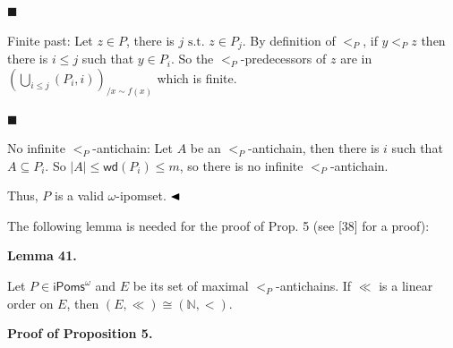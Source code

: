  
 
\par\noindent  $\blacksquare$ 
 
Finite past: Let $z\in P$, there is $j\text{ s.t.\ }z\in P_{j}$. By definition of $<_{P}$, if $y<_{P}z$ then there is $i\leqslant j$ such that $y\in P_{i}$. So the $<_{P}$-predecessors of $z$ are in $(\bigcup_{i\leqslant j}(P_{i},i))_{/x\sim f(x)}$ which is finite.\par
 
 
 
\par\noindent  $\blacksquare$ 
 
No infinite $<_{P}$-antichain: Let $A$ be an $<_{P}$-antichain, then there is $i$ such that $A\subseteq P_{i}$. So $|A|\leqslant\mathsf{wd}(P_{i})\leqslant m$, so there is no infinite $<_{P}$-antichain.\par
 
 
  
Thus, $P$ is a valid $\omega$-ipomset. $\hfill\blacktriangleleft$\par
 
 
 
The following lemma is needed for the proof of Prop. 5 (see [38] for a proof):\par
 
 
 
\par\medskip\noindent\textbf{Lemma 41.}\par
 
 
Let $P\in{\mathsf{iPoms}^{\omega}}$ and $E$ be its set of maximal $<_{P}$-antichains. If $\ll$ is a linear order on $E$, then $(E,\ll)\cong(\mathbb{N},<)$.\par
 
 
 
 
 
\par\medskip\noindent\textbf{Proof of Proposition 5.}\par
 
